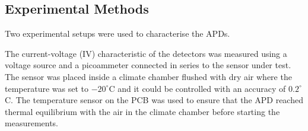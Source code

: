 \documentclass[review,number,sort&compress]{elsarticle}
\begin{document}
\subsection{Experimental Methods}

Two experimental setups were used to characterise the APDs.

The current-voltage (IV) characteristic of the detectors was measured using a voltage source and a picoammeter connected in series to the sensor under test.
The sensor was placed inside a climate chamber flushed with dry air where the temperature was set to $-20^\circ$C and it could be controlled with an accuracy of $0.2^\circ$C.
The temperature sensor on the PCB was used to ensure that the APD reached thermal equilibrium with the air in the climate chamber before starting the measurements.
\end{document}
